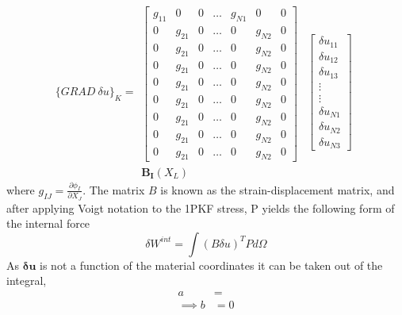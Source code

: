 \begin{equation}
\{GRAD ~\delta u\}_K = \begin{array}{c}\begin{bmatrix}
g_{11}       & 0 & 0 & \dots & g_{N1} & 0 & 0 \\
0       & g_{21} & 0 & \dots & 0 & g_{N2} & 0 \\
0       & g_{21} & 0 & \dots & 0 & g_{N2} & 0 \\
0       & g_{21} & 0 & \dots & 0 & g_{N2} & 0 \\
0       & g_{21} & 0 & \dots & 0 & g_{N2} & 0 \\
0       & g_{21} & 0 & \dots & 0 & g_{N2} & 0 \\
0       & g_{21} & 0 & \dots & 0 & g_{N2} & 0 \\
0       & g_{21} & 0 & \dots & 0 & g_{N2} & 0 \\
0       & g_{21} & 0 & \dots & 0 & g_{N2} & 0 
\end{bmatrix}\\
\mathbf{B_I}(X_L)
\end{array}\begin{array}{c}\begin{bmatrix}
\delta u_{11} \\
\delta u _{12} \\
\delta u_{13} \\
\vdots \\
\vdots \\

\delta u_{N1} \\
\delta u _{N2} \\
\delta u_{N3} 
\end{bmatrix}

\end{array}
\end{equation}
where $g_{IJ} = \frac{\partial \phi_I}{\partial X_J}$. The matrix $B$ is known as the strain-displacement matrix, and after applying Voigt notation to the 1PKF stress, P yields the following form of the internal force
\begin{equation}
\delta W^{int} = \int {(B\delta u)^T {P} d \Omega}
\end{equation}
As $\mathbf{\delta u}$ is not a function of the material coordinates it can be taken out of the integral,
\begin{align}
a &=  \\
\implies b &= 0
\end{align}
